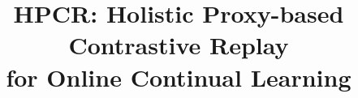\documentclass[10pt,journal,compsoc]{IEEEtran}
\begin{document}
%
\title{HPCR: Holistic Proxy-based Contrastive Replay\\for Online Continual Learning}
%
%
%
%
\end{document}
